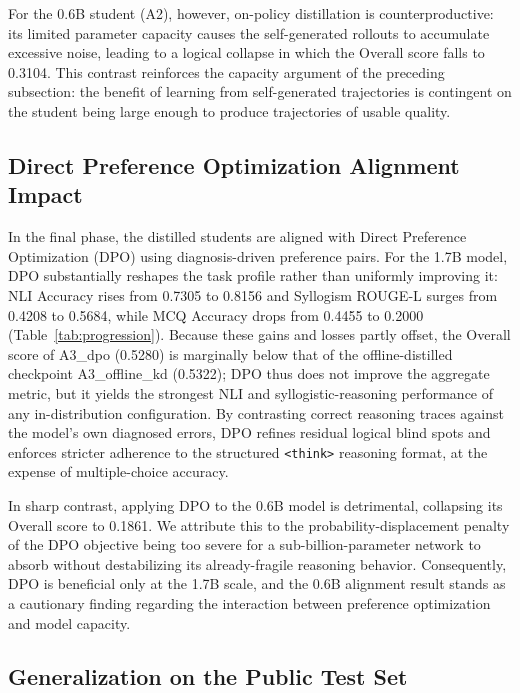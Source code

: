 For the 0.6B student (A2), however, on-policy distillation is counterproductive: its limited parameter capacity causes the self-generated rollouts to accumulate excessive noise, leading to a logical collapse in which the Overall score falls to 0.3104. This contrast reinforces the capacity argument of the preceding subsection: the benefit of learning from self-generated trajectories is contingent on the student being large enough to produce trajectories of usable quality.

\subsection{Direct Preference Optimization Alignment Impact}

In the final phase, the distilled students are aligned with Direct Preference Optimization (DPO) \parencite{rafailov2024directpreferenceoptimizationlanguage} using diagnosis-driven preference pairs. For the 1.7B model, DPO substantially reshapes the task profile rather than uniformly improving it: NLI Accuracy rises from 0.7305 to 0.8156 and Syllogism ROUGE-L surges from 0.4208 to 0.5684, while MCQ Accuracy drops from 0.4455 to 0.2000 (Table~\ref{tab:progression}). Because these gains and losses partly offset, the Overall score of A3\_dpo (0.5280) is marginally below that of the offline-distilled checkpoint A3\_offline\_kd (0.5322); DPO thus does not improve the aggregate metric, but it yields the strongest NLI and syllogistic-reasoning performance of any in-distribution configuration. By contrasting correct reasoning traces against the model's own diagnosed errors, DPO refines residual logical blind spots and enforces stricter adherence to the structured \texttt{<think>} reasoning format, at the expense of multiple-choice accuracy.

In sharp contrast, applying DPO to the 0.6B model is detrimental, collapsing its Overall score to 0.1861. We attribute this to the probability-displacement penalty of the DPO objective being too severe for a sub-billion-parameter network to absorb without destabilizing its already-fragile reasoning behavior. Consequently, DPO is beneficial only at the 1.7B scale, and the 0.6B alignment result stands as a cautionary finding regarding the interaction between preference optimization and model capacity.

\subsection{Generalization on the Public Test Set}

